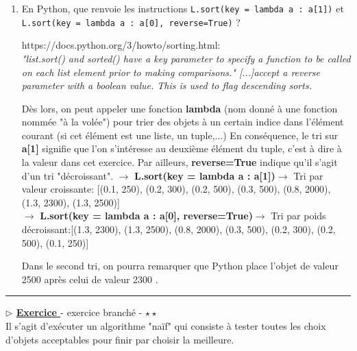 \documentclass[12pt,french]{article}
\newcounter{npb}
\newcommand{\exo}{
    \stepcounter{npb}
    {\textbf{$\triangleright$ \underline{Exercice \arabic{npb} }}}
}
\begin{document}
\begin{enumerate}
\begin{tcolorbox}
	\end{tcolorbox}

		\item En Python, que renvoie les instructions \texttt{L.sort(key = lambda a : a[1])} et\\ \texttt{L.sort(key = lambda a : a[0], reverse=True)} ?
			
		\begin{tcolorbox}[enhanced,attach boxed title to top center={yshift=-3mm,yshifttext=-1mm},
			colback=blue!5!white,colframe=blue!75!black,colbacktitle=blue!25!black,
			title=solution :, fonttitle=\bfseries,
			boxed title style={size=small,colframe=green!25!black} ]
			https://docs.python.org/3/howto/sorting.html: \\ \textit{"list.sort() and sorted() have a key parameter to specify a function to be called on each list element prior to making comparisons."
				[...]accept a reverse parameter with a boolean value. This is used to flag descending sorts.}\newline
			
			Dès lors, on peut appeler une fonction \textbf{lambda} (nom donné à une fonction nommée "à la volée") pour trier des objets à un certain indice dans l'élément courant (si cet élément est une liste, un tuple,...)
			En conséquence, le tri sur \textbf{a[1]} signifie que l'on s'intéresse au deuxième élément du tuple, c'est à dire à la valeur dans cet exercice. Par ailleurs, \textbf{reverse=True} indique qu'il s'agit d'un tri "décroissant".\newline
			\tabto{0.2cm}$\rightarrow$  \textbf{L.sort(key = lambda a : a[1])}$\rightarrow$ Tri par valeur croissante: [(0.1, 250), (0.2, 300), (0.2, 500), (0.3, 500), (0.8, 2000), (1.3, 2300), (1.3, 2500)]\\
			\tabto{0.2cm}$\rightarrow$  \textbf{L.sort(key = lambda a : a[0], reverse=True)}$\rightarrow$ Tri par poids décroissant:[(1.3, 2300), (1.3, 2500), (0.8, 2000), (0.3, 500), (0.2, 300), (0.2, 500), (0.1, 250)]
			
			Dans le second tri, on pourra remarquer que Python place l'objet de valeur 2500 après celui de valeur 2300 .
		\end{tcolorbox}
\end{enumerate}	
\hrule
\medskip
\exo - exercice branché - $\star\star$  \\	
Il s'agit d'exécuter un algorithme "naïf" qui consiste à tester toutes les choix d'objets acceptables pour finir par choisir la meilleure. 
\end{document}
